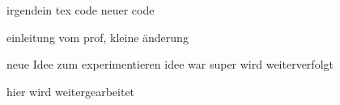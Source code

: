 irgendein tex code
neuer code

einleitung vom prof, kleine änderung

neue Idee zum experimentieren
idee war super wird weiterverfolgt

hier wird weitergearbeitet

